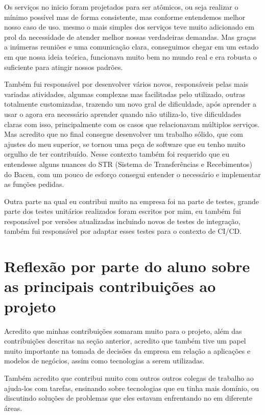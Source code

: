 \documentclass{ufscar}
\begin{document}
Os serviços no inicio foram projetados para ser atômicos, ou seja realizar o mínimo possível mas de forma consistente, mas conforme entendemos melhor nosso caso de uso. mesmo o mais simples dos serviços teve muito adicionado em prol da necessidade de atender melhor nossas verdadeiras demandas. Mas graças a inúmeras reuniões e uma comunicação clara, conseguimos chegar em um estado em que nossa ideia teórica, funcionava muito bem no mundo real e era robusta o suficiente para atingir nossos padrões.

Também fui responsável por desenvolver vários  novos, responsáveis pelas mais variadas atividades, algumas complexas mas facilitadas pelo  utilizado, outras totalmente customizadas, trazendo um novo gral de dificuldade, após aprender a usar o  agora era necessário aprender quando não utiliza-lo, tive dificuldades claras com isso, principalmente com os casos que relacionavam múltiplos serviços. Mas acredito que no final consegue desenvolver um trabalho sólido, que com ajustes do meu superior, se tornou uma peça de software que eu tenho muito orgulho de ter contribuído. Nesse contexto também foi requerido que eu entendesse alguns nuances do STR (Sistema de Transferências e Recebimentos) do Bacen, com um pouco de esforço consegui entender o necessário e implementar as funções pedidas.

Outra parte na qual eu contribui muito na empresa foi na parte de testes, grande parte dos testes unitários realizados foram escritos por mim, eu também fui responsável por versões atualizadas incluindo novos  de testes de integração, também fui responsável por adaptar esses testes para o contexto de CI/CD.


\section{Reflexão por parte do aluno sobre as principais contribuições ao projeto}

Acredito que minhas contribuições somaram muito para o projeto, além das contribuições descritas na seção anterior, acredito que também tive um papel muito importante na tomada de decisões da empresa em relação a aplicações e modelos de negócios, assim como tecnologias a serem utilizadas. 

Também acredito que contribui muito com outros outros colegas de trabalho ao ajuda-los com tarefas, ensinando sobre tecnologias que eu tinha mais domínio, ou discutindo soluções de problemas que eles estavam enfrentando no em diferente áreas. 
\end{document}

